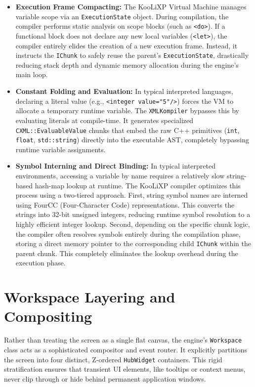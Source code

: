 \documentclass[11pt, a4paper]{article}
\begin{document}
\begin{itemize}
    \item \textbf{Execution Frame Compacting:} The KooLiXP Virtual Machine manages variable scope via an \texttt{ExecutionState} object. During compilation, the compiler performs static analysis on scope blocks (such as \texttt{<do>}). If a functional block does not declare any new local variables (\texttt{<let>}), the compiler entirely elides the creation of a new execution frame. Instead, it instructs the \texttt{IChunk} to safely reuse the parent's \texttt{ExecutionState}, drastically reducing stack depth and dynamic memory allocation during the engine's main loop.
    
    \item \textbf{Constant Folding and Evaluation:} In typical interpreted languages, declaring a literal value (e.g., \texttt{<integer value="5"/>}) forces the VM to allocate a temporary runtime variable. The \texttt{XMLKompiler} bypasses this by evaluating literals at compile-time. It generates specialized \texttt{CXML::EvaluableValue} chunks that embed the raw C++ primitives (\texttt{int}, \texttt{float}, \texttt{std::string}) directly into the executable AST, completely bypassing runtime variable assignments.
    
    \item \textbf{Symbol Interning and Direct Binding:} In typical interpreted environments, accessing a variable by name requires a relatively slow string-based hash-map lookup at runtime. The KooLiXP compiler optimizes this process using a two-tiered approach. First, string symbol names are interned using FourCC (Four-Character Code) representations. This converts the strings into 32-bit unsigned integers, reducing runtime symbol resolution to a highly efficient integer lookup. Second, depending on the specific chunk logic, the compiler often resolves symbols entirely during the compilation phase, storing a direct memory pointer to the corresponding child \texttt{IChunk} within the parent chunk. This completely eliminates the lookup overhead during the execution phase.
\end{itemize}

\section{Workspace Layering and Compositing}
Rather than treating the screen as a single flat canvas, the engine's \texttt{Workspace} class acts as a sophisticated compositor and event router. It explicitly partitions the screen into four distinct, Z-ordered \texttt{HubWidget} containers. This rigid stratification ensures that transient UI elements, like tooltips or context menus, never clip through or hide behind permanent application windows.
\end{document}
